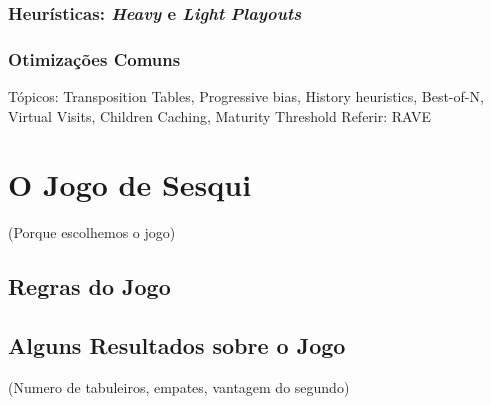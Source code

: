 \documentclass[12pt,a4paper,oneside]{article}
\begin{document}
\subsubsection{Heurísticas: \textit{Heavy} e \textit{Light} \textit{Playouts}}

\lipsum[1]

\lipsum[2]

\subsubsection{Otimizações Comuns}


Tópicos: Transposition Tables, Progressive bias, History heuristics, Best-of-N, Virtual Visits, Children Caching, Maturity Threshold
Referir: RAVE

\lipsum[1]

\lipsum[2]

\lipsum[3]

\lipsum[4]

\lipsum[5]



\section{O Jogo de Sesqui}
\label{sec:sesqui}

(Porque escolhemos o jogo)

\lipsum[1]

\subsection{Regras do Jogo}

\lipsum[1]

\lipsum[2]

\lipsum[3]

\subsection{Alguns Resultados sobre o Jogo}

(Numero de tabuleiros, empates, vantagem do segundo)

\lipsum[1]
\end{document}

